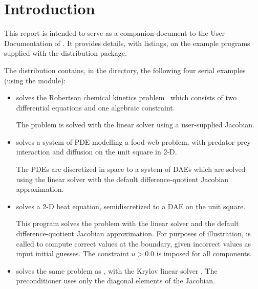 \section{Introduction}\label{s:ex_intro}

This report is intended to serve as a companion document to the User
Documentation of {\ida} \cite{ida2.2.0_ug}.  It provides details, with
listings, on the example programs supplied with the {\ida} distribution
package.

The {\ida} distribution contains, in the 
directory, the following four serial examples (using the {\nvecs} module):
\begin{itemize}

\item {}
  solves the Robertson chemical kinetics problem~\cite{Rob:66} which consists
  of two differential equations and one algebraic constraint.

  The problem is solved with the {\idadense} linear solver using
  a user-supplied Jacobian.

\item {}
  solves a system of PDE modelling a food web problem, with predator-prey
  interaction and diffusion on the unit square in 2-D.

  The PDEs are discretized in space to a system of DAEs which are solved
  using the {\idaband} linear solver with the default difference-quotient 
  Jacobian approximation.

\item {}
  solves a 2-D heat equation, semidiscretized to a DAE on the unit square.

  This program solves the problem with the {\idaband} linear solver and
  the default difference-quotient Jacobian approximation. For purposes of
  illustration,  is called to compute correct values at the
  boundary, given incorrect values as input initial guesses. The constraint
  $u > 0.0$ is imposed for all components.

\item {}
  solves the same problem as , with the Krylov linear solver
  {\idaspgmr}. The preconditioner uses only the diagonal elements of the 
  Jacobian.

\end{itemize}

